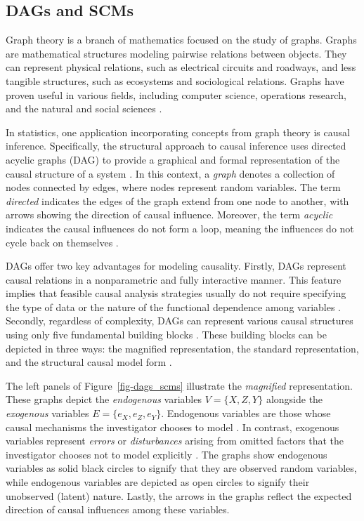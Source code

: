 \documentclass[
  authoryear,
  preprint,
  1p]{elsarticle}
\begin{document}
\subsection{DAGs and SCMs}\label{sec-framework-dag}

Graph theory is a branch of mathematics focused on the study of graphs.
Graphs are mathematical structures modeling pairwise relations between
objects. They can represent physical relations, such as electrical
circuits and roadways, and less tangible structures, such as ecosystems
and sociological relations. Graphs have proven useful in various fields,
including computer science, operations research, and the natural and
social sciences \citep{Gross_et_al_2018}.

In statistics, one application incorporating concepts from graph theory
is causal inference. Specifically, the structural approach to causal
inference uses directed acyclic graphs (DAG) to provide a graphical and
formal representation of the causal structure of a system
\citep{Neal_2020}. In this context, a \emph{graph} denotes a collection
of nodes connected by edges, where nodes represent random variables. The
term \emph{directed} indicates the edges of the graph extend from one
node to another, with arrows showing the direction of causal influence.
Moreover, the term \emph{acyclic} indicates the causal influences do not
form a loop, meaning the influences do not cycle back on themselves
\citep{McElreath_2020}.

DAGs offer two key advantages for modeling causality. Firstly, DAGs
represent causal relations in a nonparametric and fully interactive
manner. This feature implies that feasible causal analysis strategies
usually do not require specifying the type of data or the nature of the
functional dependence among variables \citep{Morgan_et_al_2014}.
Secondly, regardless of complexity, DAGs can represent various causal
structures using only five fundamental building blocks
\citep{Neal_2020, McElreath_2020}. These building blocks can be depicted
in three ways: the magnified representation, the standard
representation, and the structural causal model form
\citep[SCM,][]{Morgan_et_al_2014}.

The left panels of Figure~\ref{fig-dags_scms} illustrate the
\emph{magnified} representation. These graphs depict the
\emph{endogenous} variables \(V=\{X,Z,Y\}\) alongside the
\emph{exogenous} variables \(E=\{e_{X},e_{Z},e_{Y}\}\). Endogenous
variables are those whose causal mechanisms the investigator chooses to
model \citep{Neal_2020}. In contrast, exogenous variables represent
\emph{errors} or \emph{disturbances} arising from omitted factors that
the investigator chooses not to model explicitly
\citep[27,68]{Pearl_2009}. The graphs show endogenous variables as solid
black circles to signify that they are observed random variables, while
endogenous variables are depicted as open circles to signify their
unobserved (latent) nature. Lastly, the arrows in the graphs reflect the
expected direction of causal influences among these variables.
\end{document}
